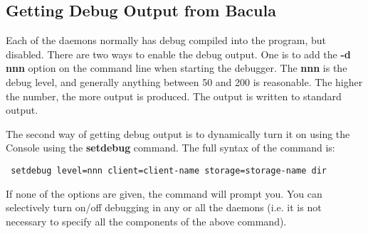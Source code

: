 \subsection*{Getting Debug Output from Bacula}

Each of the daemons normally has debug compiled into the program, but
disabled. There are two ways to enable the debug output. One is to add the
{\bf -d nnn} option on the command line when starting the debugger. The {\bf
nnn} is the debug level, and generally anything between 50 and 200 is
reasonable. The higher the number, the more output is produced. The output is
written to standard output. 

The second way of getting debug output is to dynamically turn it on using the
Console using the {\bf setdebug} command. The full syntax of the command is: 

\footnotesize
\begin{verbatim}
 setdebug level=nnn client=client-name storage=storage-name dir
\end{verbatim}
\normalsize

If none of the options are given, the command will prompt you. You can
selectively turn on/off debugging in any or all the daemons (i.e. it is not
necessary to specify all the components of the above command). 
